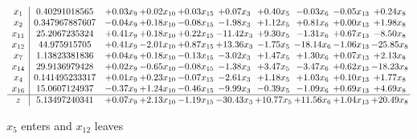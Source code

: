 \documentclass[9pt]{article}
\begin{document}
 \[\begin{array}{c| c c@{\hskip 2pt} c@{\hskip 2pt} c@{\hskip 2pt} c@{\hskip 2pt} c@{\hskip 2pt} c@{\hskip 2pt} c@{\hskip 2pt} c@{\hskip 2pt} }
 x_{1}   &  0.40291018565 & +  0.03 x_{9} & +  0.02 x_{10} & +  0.03 x_{15} & +  0.07 x_{3} & +  0.40 x_{5} & -0.03 x_{6} & -0.05 x_{13} & +  0.24 x_{8}\\
 x_{2}   &  0.347967887607 & -0.04 x_{9} & +  0.18 x_{10} & -0.08 x_{15} & -1.98 x_{3} & +  1.12 x_{5} & +  0.81 x_{6} & +  0.00 x_{13} & +  1.98 x_{8}\\
 x_{11}   &  25.2067235324 & +  0.41 x_{9} & +  0.18 x_{10} & +  0.22 x_{15} & -11.42 x_{3} & +  9.30 x_{5} & -1.31 x_{6} & +  0.67 x_{13} & -8.50 x_{8}\\
 x_{12}   &  44.975915705 & +  0.41 x_{9} & -2.01 x_{10} & +  0.87 x_{15} & + 13.36 x_{3} & -1.75 x_{5} & -18.14 x_{6} & -1.06 x_{13} & -25.85 x_{8}\\
 x_{7}   &  1.13823381836 & +  0.04 x_{9} & +  0.18 x_{10} & -0.13 x_{15} & -3.02 x_{3} & +  1.47 x_{5} & +  1.30 x_{6} & +  0.07 x_{13} & +  2.13 x_{8}\\
 x_{14}   &  29.9136979428 & +  0.02 x_{9} & -0.65 x_{10} & -0.08 x_{15} & -1.38 x_{3} & +  3.47 x_{5} & -3.47 x_{6} & +  0.62 x_{13} & -18.23 x_{8}\\
 x_{4}   &  0.141495233317 & +  0.01 x_{9} & +  0.23 x_{10} & -0.07 x_{15} & -2.61 x_{3} & +  1.18 x_{5} & +  1.03 x_{6} & +  0.10 x_{13} & +  1.77 x_{8}\\
 x_{16}   &  15.0607124937 & -0.37 x_{9} & +  1.24 x_{10} & -0.46 x_{15} & -9.99 x_{3} & -0.39 x_{5} & -1.09 x_{6} & +  0.69 x_{13} & +  4.69 x_{8}\\
\hline
z    &  5.13497240341 & +  0.07 x_{9} & +  2.13 x_{10} & -1.19 x_{15} & -30.43 x_{3} & + 10.77 x_{5} & + 11.56 x_{6} & +  1.04 x_{13} & + 20.49 x_{8}\\
\end{array}\]


 $ x_{5} $ enters and $ x_{12} $ leaves 
\end{document}
